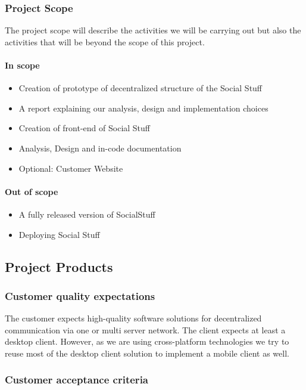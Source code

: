 \subsubsection{Project Scope}

The project scope will describe the activities we will be carrying out but also the activities that will be beyond the
scope of this project.

\paragraph{In scope}
\begin{itemize}
    \item Creation of prototype of decentralized structure of the Social Stuff
    \item A report explaining our analysis, design and implementation choices
    \item Creation of front-end of Social Stuff
    \item Analysis, Design and in-code documentation
    \item Optional: Customer Website
\end{itemize}

\paragraph{Out of scope}
\begin{itemize}
    \item A fully released version of SocialStuff
    \item Deploying Social Stuff
\end{itemize}

\subsection{Project Products}

\subsubsection{Customer quality expectations}

The customer expects high-quality software solutions for decentralized communication via one or multi server network.
The client expects at least a desktop client.
However, as we are using cross-platform technologies we try to reuse most of the desktop client solution to implement
a mobile client as well.

\subsubsection{Customer acceptance criteria}


